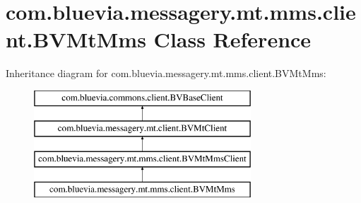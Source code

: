 \hypertarget{classcom_1_1bluevia_1_1messagery_1_1mt_1_1mms_1_1client_1_1BVMtMms}{
\section{com.bluevia.messagery.mt.mms.client.BVMtMms Class Reference}
\label{classcom_1_1bluevia_1_1messagery_1_1mt_1_1mms_1_1client_1_1BVMtMms}
}
Inheritance diagram for com.bluevia.messagery.mt.mms.client.BVMtMms:\begin{figure}[H]
\begin{center}
\leavevmode
\includegraphics[height=4.000000cm]{classcom_1_1bluevia_1_1messagery_1_1mt_1_1mms_1_1client_1_1BVMtMms}
\end{center}
\end{figure}
